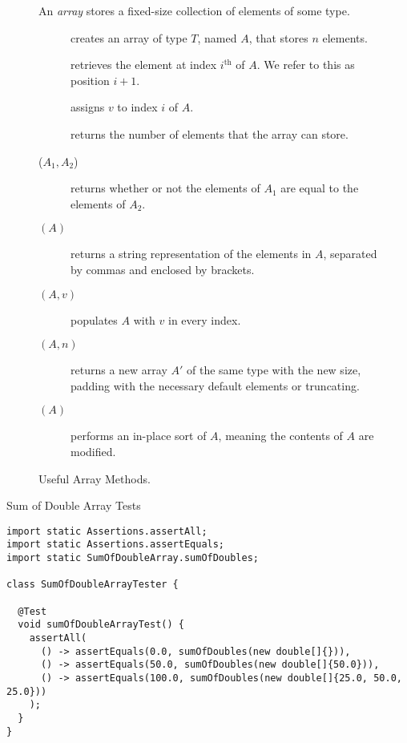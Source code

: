 \begin{figure}[tp]
  \small
  \begin{tcolorbox}[title=Java Arrays]
    An \textit{array} stores a fixed-size collection of elements of some type.
    \vspace{2ex}
  \begin{description}
    \item [] creates an array of type $T$, named $A$, that stores $n$ elements.
    \item [] retrieves the element at index $i^{\text{th}}$ of $A$. We refer to this as position $i + 1$.
    \item [] assigns $v$ to index $i$ of $A$.
    \item [] returns the number of elements that the array can store.
    \item [($A_1, A_2$)] returns whether or not the elements of $A_1$ are equal to the elements of $A_2$.
    \item [$(A)$] returns a string representation of the elements in $A$, separated by commas and enclosed by brackets.
    \item [$(A, v)$] populates $A$ with $v$ in every index.
    \item [$(A, n)$] returns a new array $A'$ of the same type with the new size, padding with the necessary default elements or truncating.
    \item [$(A)$] performs an in-place sort of $A$, meaning the contents of $A$ are modified.
  \end{description}
\end{tcolorbox}
  \caption{Useful Array Methods.}
  \label{fig:arrays}
\end{figure}


\begin{cl}{Sum of Double Array Tests}
\begin{lstlisting}[language=MyJava]
import static Assertions.assertAll;
import static Assertions.assertEquals;
import static SumOfDoubleArray.sumOfDoubles;

class SumOfDoubleArrayTester {

  @Test
  void sumOfDoubleArrayTest() {
    assertAll(
      () -> assertEquals(0.0, sumOfDoubles(new double[]{})),
      () -> assertEquals(50.0, sumOfDoubles(new double[]{50.0})),
      () -> assertEquals(100.0, sumOfDoubles(new double[]{25.0, 50.0, 25.0}))
    );
  }
}
\end{lstlisting}
\end{cl}

